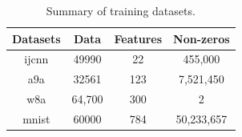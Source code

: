\documentclass{article}
\theoremstyle{definition}
\theoremstyle{remark}
\begin{document}
\begin{table}[htbp]
\begin{center}
\caption{Summary of training datasets.}
\begin{tabular}{ c|c|c|c } 
 \hline
 Datasets &  Data & Features & Non-zeros \\ 
 \hline
  ijcnn & 49990 & 22 &  455,000\\
  a9a & 32561 & 123 & 7,521,450\\ 
 w8a & 64,700  & 300 & 2 \\ 
 mnist & 60000 & 784 &  50,233,657\\
 \hline
\end{tabular}
\label{metadata}
\end{center}
\end{table}
\end{document}
